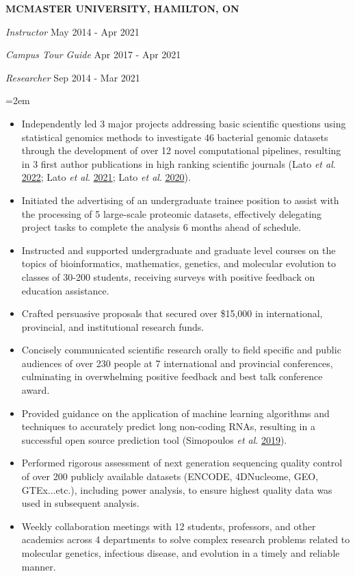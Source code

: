 \documentclass[paper=a4,fontsize=11pt]{scrartcl}	 			%
\newcommand{\EducationEntry}[4]{
		\noindent \textbf{#1} \hfill 					%
		\colorbox{White}{%
			\parbox{10em}{%
			\hfill\color{Black}#2}} \par				%
		\noindent \textit{#3} \par					%
		\noindent\hangindent=2em\hangafter=0 \small #4 	%
		\normalsize \par}
\newcommand{\WorkEntryThree}[8]{						%
		\noindent \textbf{#1} \par		%
		\noindent \textit{\noindent #2} \hfill 					%
		\noindent \colorbox{White}{\color{Black}#3} \par
		\noindent \textit{\noindent #4} \hfill 					%
		\noindent \colorbox{White}{\color{Black}#5} \par
		\noindent \textit{\noindent #6} \hfill 					%
		\noindent \colorbox{White}{\color{Black}#7} \par					%
		\noindent\hangindent=2em\hangafter=0 \small #8 	%
		\normalsize \par}
\begin{document}
\WorkEntryThree{\MakeUppercase{McMaster University, Hamilton, ON}}
{Instructor}{May 2014 - Apr 2021}
{Campus Tour Guide}{Apr 2017 - Apr 2021}
{Researcher}{Sep 2014 - Mar 2021}{
	\begin{itemize}
		\item Independently led 3 major projects addressing basic scientific questions using statistical genomics methods to investigate 46 bacterial genomic datasets through the development of over 12 novel computational pipelines, resulting in 3 first author publications in high ranking scientific journals (Lato \textit{et al}. \href{https://doi.org/10.1139/gen-2021-0102}{2022}; Lato \textit{et al}. \href{https://doi.org/10.1093/gbe/evaa260}{2021}; Lato \textit{et al}. \href{https://doi.org/10.1007/s00239-020-09951-3}{2020}).
		\item Initiated the advertising of an undergraduate trainee position to assist with the processing of 5 large-scale proteomic datasets, effectively delegating project tasks to complete the analysis 6 months ahead of schedule.
		\item Instructed and supported undergraduate and graduate level courses on the topics of bioinformatics, mathematics, genetics, and molecular evolution to classes of 30-200 students, receiving surveys with positive feedback on education assistance.
		\item Crafted persuasive proposals that secured
		over \$15,000 in international, provincial, and institutional research funds.
		\item Concisely communicated scientific research orally to field specific and public audiences of over 230 people at 7 international and provincial conferences, culminating in overwhelming positive feedback and best talk conference award.
		\item Provided guidance on the application of machine learning algorithms and techniques to accurately predict long non-coding RNAs, resulting in a successful open source prediction tool (Simopoulos \textit{et al}. \href{https://doi.org/10.1186/s12864-018-4665-2}{2019}).
		\item Performed rigorous assessment of next generation sequencing quality control of over 200 publicly available datasets (ENCODE, 4DNucleome, GEO, GTEx...etc.), including power analysis, to ensure highest quality data was used in subsequent analysis.
		\item Weekly collaboration meetings with 12 students, professors, and other academics across 4 departments to solve complex research problems related to molecular genetics, infectious disease, and evolution in a timely and reliable manner.

\end{itemize}}
\end{document}
